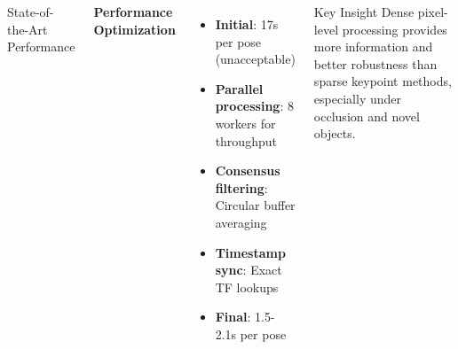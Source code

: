 \documentclass[serif, aspectratio=169, 9pt]{beamer}
\begin{document}
\begin{frame}
\begin{columns}
\begin{block}{State-of-the-Art Performance}
        \end{block}
        \textbf{Performance Optimization}
        \begin{itemize}
            \item \textbf{Initial}: 17s per pose (unacceptable)
            \item \textbf{Parallel processing}: 8 workers for throughput
            \item \textbf{Consensus filtering}: Circular buffer averaging
            \item \textbf{Timestamp sync}: Exact TF lookups
            \item \textbf{Final}: 1.5-2.1s per pose
        \end{itemize}
        \vspace{0.3em}
        \begin{block}{Key Insight}
            \footnotesize
            Dense pixel-level processing provides more information and better robustness than sparse keypoint methods, especially under occlusion and novel objects.
        \end{block}
    \end{columns}
\end{frame}
\end{document}
